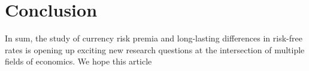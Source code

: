 \documentclass{ar-1col}
\begin{document}
\section{Conclusion}

In sum, the study of currency risk premia and long-lasting differences in risk-free rates is opening up exciting new research questions at the intersection of multiple fields of economics. We hope this article  



\newpage

 

\clearpage



    
\end{document}
